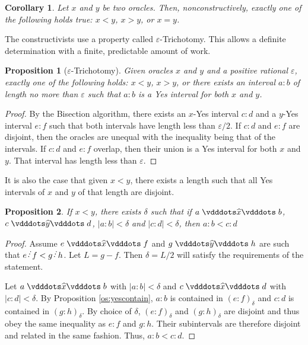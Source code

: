 \documentclass[12pt]{article}
\newtheorem{corollary}{Corollary}[section]
\newtheorem{proposition}{Proposition}[section]
\begin{document}
\begin{corollary}
    Let $x$ and $y$ be two oracles. Then, nonconstructively, exactly one of the following holds true: $x<y$, $x>y$, or $x=y$.
\end{corollary}

The constructivists use a property called $\varepsilon$-Trichotomy. This allows a definite determination with a finite, predictable amount of work. 

\begin{proposition}[$\varepsilon$-Trichotomy]
    Given oracles $x$ and $y$ and a positive rational $\varepsilon$, exactly one of the following holds: $x<y$, $x>y$, or there exists an interval $a:b$ of length no more than $\varepsilon$ such that $a:b$ is a Yes interval for both $x$ and $y$.
\end{proposition}

\begin{proof}
    By the Bisection algorithm, there exists an $x$-Yes interval $c:d$ and a $y$-Yes interval $e:f$ such that both intervals have length less than $\varepsilon/2$. If $c:d$ and $e:f$ are disjoint, then the oracles are unequal with the inequality being that of the intervals. If $c:d$ and $e:f$ overlap, then their union is a Yes interval for both $x$ and $y$. That interval has length less than $\varepsilon$.
\end{proof}

It is also the case that given $x < y$, there exists a length such that all Yes intervals of $x$ and $y$ of that length are disjoint. 

\begin{proposition}
    If $ x< y$, there exists $\delta$ such that if $a \xora b$, $c \xora[y] d$, $|a:b| < \delta$ and $|c:d| < \delta$, then $a:b < c:d$
\end{proposition}

\begin{proof}
    Assume $e \xora f$ and $g \xora[y] h$ are such that $e\lte f < g \lte h$. Let $L = g-f$. Then $\delta = L/2$ will satisfy the requirements of the statement. 

    Let $a \xora b$ with $|a:b| < \delta$ and $c \xora d$ with $|c:d| < \delta$. By Proposition \ref{os:yescontain}, $a:b$ is contained in $(e:f)_\delta$ and $c:d$ is contained in $(g:h)_\delta$. By choice of $\delta$, $(e:f)_\delta$ and $(g:h)_\delta$ are disjoint and thus obey the same inequality as $e:f$ and $g:h$. Their subintervals are therefore disjoint and related in the same fashion. Thus, $a:b < c:d$. 
\end{proof}
\end{document}

